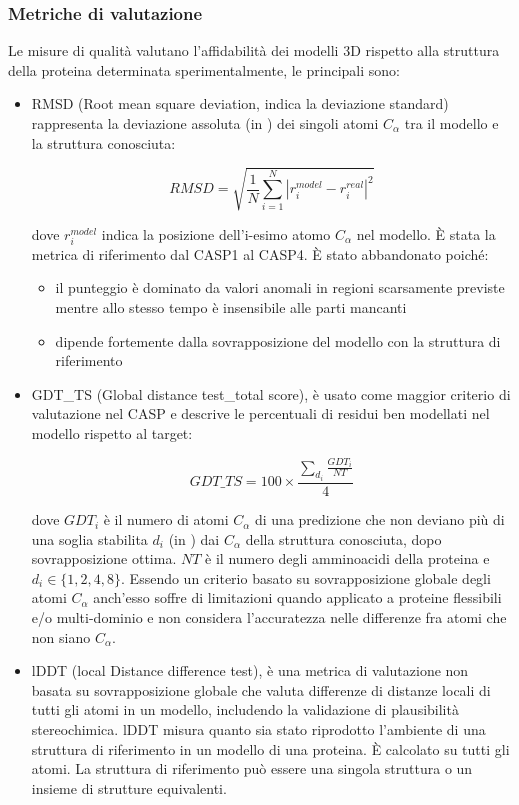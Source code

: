 
\subsubsection{Metriche di valutazione}
Le misure di qualità valutano l'affidabilità dei modelli 3D rispetto alla struttura della proteina determinata sperimentalmente, le principali sono\supercite{marquez2015soft}:

\begin{itemize}
	\item RMSD (Root mean square deviation, indica la deviazione standard) rappresenta la deviazione assoluta (in \angstrom) dei singoli atomi $C_{\alpha}$ tra il modello e la struttura conosciuta:
	
	\[  RMSD = \sqrt{\frac{1}{N} \sum_{i=1}^{N} \left|r_{i}^{model}-r_{i}^{real}\right|^{2}}  \]
	
	dove $r_{i}^{model}$ indica la posizione dell'i-esimo atomo $C_{\alpha}$ nel modello. È stata la metrica di riferimento dal CASP1 al CASP4. È stato abbandonato poiché:
	
	\begin{itemize}
		\item il punteggio è dominato da valori anomali in regioni scarsamente previste mentre allo stesso tempo è insensibile alle parti mancanti 
		\item dipende fortemente dalla sovrapposizione del modello con la struttura di riferimento
	\end{itemize}
	
	\item GDT\_TS (Global distance test\_total score), è usato come maggior criterio di valutazione nel CASP e descrive le percentuali di residui ben modellati nel modello rispetto al target:
	
	\[ GDT\_TS = 100 \times \frac{\sum_{d_{i}} \frac{GDT_{i}}{NT}} {4} \]
	
	dove $GDT_{i}$ è il numero di atomi $C_{\alpha}$ di una predizione che non deviano più di una soglia stabilita $d_{i}$ (in \angstrom) dai $C_{\alpha}$ della struttura conosciuta, dopo sovrapposizione ottima. $NT$ è il numero degli amminoacidi della proteina e $d_{i} \in \{1,2,4,8\}$. Essendo un criterio basato su sovrapposizione globale degli atomi $C_{\alpha}$ anch'esso soffre di limitazioni quando applicato a proteine flessibili e/o multi-dominio e non considera l'accuratezza nelle differenze fra atomi che non siano $C_{\alpha}$.\\
	
	\item lDDT (local Distance difference test), è una metrica di valutazione non basata su sovrapposizione globale che valuta differenze di distanze locali di tutti gli atomi in un modello, includendo la validazione di plausibilità stereochimica\supercite{mariani2013lddt}. lDDT misura quanto sia stato riprodotto l'ambiente di una struttura di riferimento in un modello di una proteina. È calcolato su tutti gli atomi. La struttura di riferimento può essere una singola struttura o un insieme di strutture equivalenti. 
	

\end{itemize}
